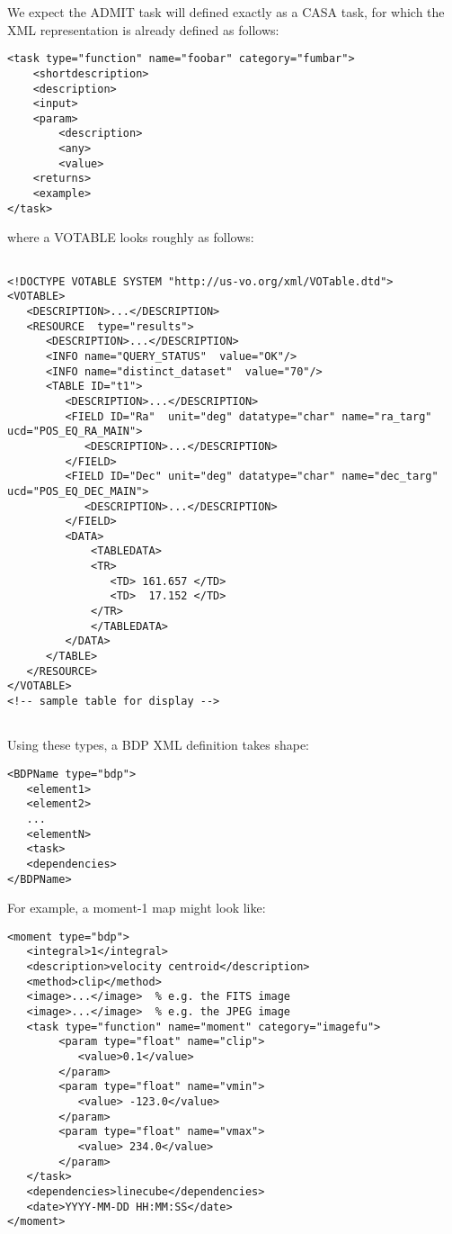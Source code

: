 \documentclass{article}
\begin{document}
We expect the ADMIT task will defined exactly as a CASA task, for which the XML
representation is already defined as follows:

\begin{verbatim}
<task type="function" name="foobar" category="fumbar">
    <shortdescription>
    <description>
    <input>
    <param>
        <description>
        <any>
        <value>
    <returns>
    <example>
</task>  

\end{verbatim}

where a VOTABLE looks roughly as follows:
\begin{verbatim}

<!DOCTYPE VOTABLE SYSTEM "http://us-vo.org/xml/VOTable.dtd">
<VOTABLE>
   <DESCRIPTION>...</DESCRIPTION>
   <RESOURCE  type="results">
      <DESCRIPTION>...</DESCRIPTION>
      <INFO name="QUERY_STATUS"  value="OK"/>
      <INFO name="distinct_dataset"  value="70"/>
      <TABLE ID="t1">
         <DESCRIPTION>...</DESCRIPTION>
         <FIELD ID="Ra"  unit="deg" datatype="char" name="ra_targ"  ucd="POS_EQ_RA_MAIN"> 
            <DESCRIPTION>...</DESCRIPTION>
         </FIELD>
         <FIELD ID="Dec" unit="deg" datatype="char" name="dec_targ" ucd="POS_EQ_DEC_MAIN">
            <DESCRIPTION>...</DESCRIPTION>
         </FIELD>
         <DATA>
             <TABLEDATA>
             <TR>
                <TD> 161.657 </TD>
                <TD>  17.152 </TD>
             </TR>
             </TABLEDATA>
         </DATA>
      </TABLE>
   </RESOURCE>
</VOTABLE>
<!-- sample table for display -->
         

\end{verbatim}

Using these types, a BDP XML definition takes shape:

\begin{verbatim}
<BDPName type="bdp">
   <element1>
   <element2>
   ...
   <elementN>
   <task>
   <dependencies>
</BDPName>

\end{verbatim}

\noindent For example, a moment-1 map might look like:

\begin{verbatim}
<moment type="bdp">
   <integral>1</integral>
   <description>velocity centroid</description>
   <method>clip</method>
   <image>...</image>  % e.g. the FITS image
   <image>...</image>  % e.g. the JPEG image
   <task type="function" name="moment" category="imagefu">
        <param type="float" name="clip">
           <value>0.1</value>
        </param>
        <param type="float" name="vmin">
           <value> -123.0</value>
        </param>
        <param type="float" name="vmax">
           <value> 234.0</value>
        </param>
   </task>
   <dependencies>linecube</dependencies>
   <date>YYYY-MM-DD HH:MM:SS</date>
</moment>

\end{verbatim}
\end{document}
